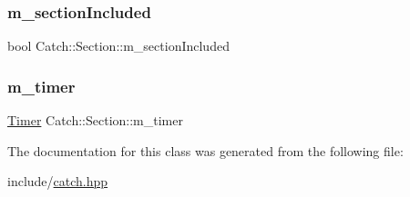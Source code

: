 \subsubsection{\texorpdfstring{m\_sectionIncluded}{m\_sectionIncluded}}
{\footnotesize\ttfamily bool Catch\+::\+Section\+::m\+\_\+section\+Included\hspace{0.3cm}{\ttfamily [private]}}

\mbox{\label{class_catch_1_1_section_a1548993afa64305a1b093391c6884b7e}} 
\subsubsection{\texorpdfstring{m\_timer}{m\_timer}}
{\footnotesize\ttfamily \mbox{\hyperlink{class_catch_1_1_timer}{Timer}} Catch\+::\+Section\+::m\+\_\+timer\hspace{0.3cm}{\ttfamily [private]}}



The documentation for this class was generated from the following file\+:\begin{DoxyCompactItemize}
\item 
include/\mbox{\hyperlink{catch_8hpp}{catch.\+hpp}}\end{DoxyCompactItemize}
